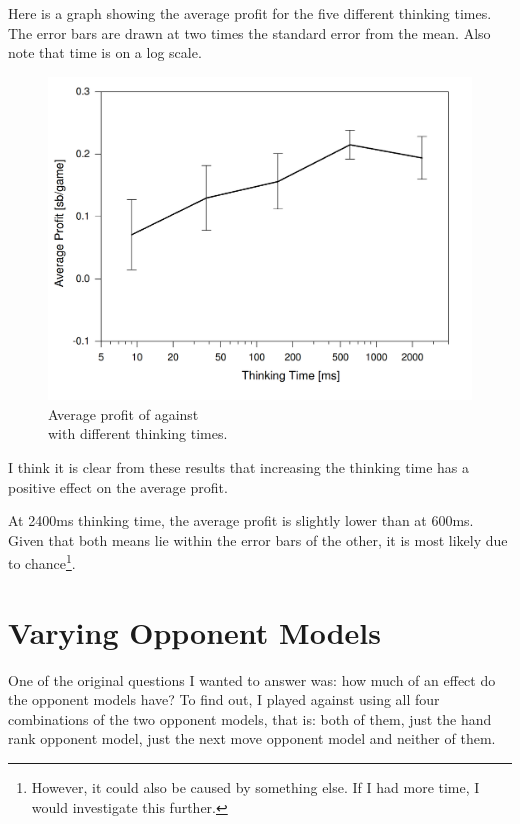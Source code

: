 Here is a graph showing the average profit for the five different thinking times. The error bars are drawn at two times the standard error from the mean. Also note that time is on a log scale.
\begin{figure}[H]
\centering
\includegraphics[width=144mm]{Graphs/SBvMB-time.png}
\caption{Average profit of \mbt against \sbt \\ with different thinking times.}
\end{figure}


I think it is clear from these results that increasing the thinking time has a positive effect on the average profit. 

At 2400ms thinking time, the average profit is slightly lower than at 600ms. Given that both means lie within the error bars of the other, it is most likely due to chance\footnote{However, it could also be caused by something else. If I had more time, I would investigate this further.}. 





\section{Varying Opponent Models}				%

One of the original questions I wanted to answer was: how much of an effect do the opponent models have? To find out, I played \mbt against \sbt using all four combinations of the two opponent models, that is: both of them, just the hand rank opponent model, just the next move opponent model and neither of them. 

